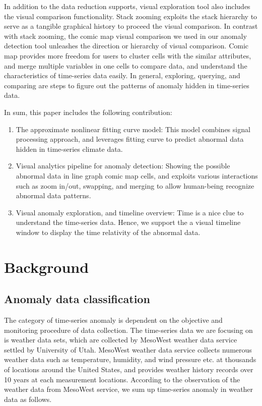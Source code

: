\documentclass{vgtc}                          %
\begin{document}
In addition to the data reduction supports, visual exploration tool also includes the visual comparison functionality. Stack zooming \cite{javed2010stack} exploits the stack hierarchy to serve as a tangible graphical history to proceed the visual comparison. In contrast with stack zooming, the comic map visual comparison we used in our anomaly detection tool unleashes the direction or hierarchy of visual comparison. Comic map provides more freedom for users to cluster cells with the similar attributes, and merge multiple variables in one cells to compare data, and understand the characteristics of time-series data easily. In general, exploring, querying, and comparing are steps to figure out the patterns of anomaly hidden in time-series data.
		
In sum, this paper includes the following contribution:
\begin{enumerate}
	\item The approximate nonlinear fitting curve model: This model combines signal processing approach, and leverages fitting curve to predict abnormal data hidden in time-series climate data.
	
	\item Visual analytics pipeline for anomaly detection: Showing the possible abnormal data in line graph comic map cells, and exploits various interactions such as zoom in/out, swapping, and merging to allow human-being recognize abnormal data patterns.
	
	\item Visual anomaly exploration, and timeline overview: Time is a nice clue to understand the time-series data. Hence, we support the a visual timeline window to display the time relativity of the abnormal data.
\end{enumerate}

\section{Background}

\subsection{Anomaly data classification}

The category of time-series anomaly is dependent on the objective and monitoring procedure of data collection. The time-series data we are focusing on is weather data sets, which are collected by MesoWest weather data service settled by University of Utah. MesoWest weather data service collects numerous weather data such as temperature, humidity, and wind pressure etc. at thousands of locations around the United States, and provides weather history records over 10 years at each measurement locations. According to the observation of the weather data from MesoWest service, we sum up time-series anomaly in weather data as follows.
\end{document}
